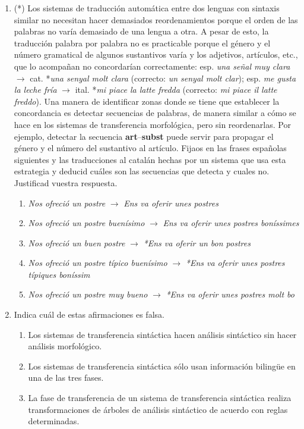 \begin{enumerate}
\item (*) \label{ex:postres} Los sistemas de traducción automática entre dos lenguas con sintaxis similar no necesitan hacer demasiados reordenamientos porque el orden de las palabras no varía demasiado de una lengua a otra. A pesar de esto, la traducción palabra por palabra no es practicable porque el género y el número gramatical de algunos sustantivos varía y los adjetivos, artículos, etc., que lo acompañan no concordarían correctamente: esp. {\em una señal muy clara\/} $\rightarrow$ cat. *{\em una senyal molt clara} (correcto: {\em un senyal molt clar\/}); esp. {\em me gusta la leche fría} $\rightarrow$ ital. *{\em mi piace la latte fredda\/} (correcto: {\em mi piace il latte freddo}). Una manera de identificar zonas donde se tiene que establecer la concordancia es detectar secuencias de palabras, de manera similar a cómo se hace en los sistemas de transferencia morfológica, pero sin reordenarlas. Por ejemplo, detectar la secuencia {\bf art}--{\bf subst} puede servir para propagar el género y el número del sustantivo al artículo. Fijaos en las frases españolas siguientes y las traducciones al catalán hechas por un sistema que usa esta estrategia y deducid cuáles son las secuencias que detecta y cuales no. Justificad vuestra respuesta. \begin{enumerate} \item \emph{Nos ofreció un postre} $\rightarrow$ \emph{Ens va oferir unes postres\/} \item \emph{Nos ofreció un postre buenísimo} $\rightarrow$ \emph{Ens va oferir unes postres boníssimes\/} \item \emph{Nos ofreció un buen postre} $\rightarrow$ \emph{*Ens va oferir un bon postres\/} \item \emph{Nos ofreció un postre típico buenísimo\/} $\rightarrow$ \emph{*Ens va oferir unes postres típiques boníssim\/} \item \emph{Nos ofreció un postre muy bueno} $\rightarrow$ \emph{*Ens va oferir unes postres molt bo\/} \end{enumerate} 

\item Indica cuál de estas afirmaciones es falsa. \begin{enumerate} \item Los sistemas de transferencia sintáctica hacen análisis sintáctico sin hacer análisis morfológico. \item Los sistemas de transferencia sintáctica sólo usan información bilingüe en una de las tres fases. \item La fase de transferencia de un sistema de transferencia sintáctica realiza transformaciones de árboles de análisis sintáctico de acuerdo con reglas determinadas. \end{enumerate} 


\end{enumerate}
